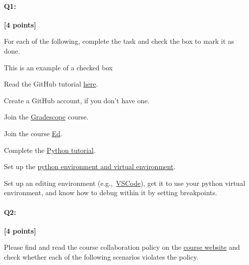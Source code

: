 \documentclass[11pt]{article}
\newcommand{\cmark}{\ding{51}}%
\newcommand{\done}{\rlap{$\square$}{\raisebox{2pt}{\large\hspace{1pt}\cmark}}%
\hspace{-2.5pt}}
\begin{document}
\pagebreak


\paragraph{Q1:} \textbf{[4 points]}
\begin{tcolorbox}[colback=orange!5!white,colframe=orange!75!black]
For each of the following, complete the task and check the box to mark it as done.
\end{tcolorbox}


\begin{tcolorbox}[colback=white!5!white,colframe=green!75!black]

\begin{todolist}
    \item[\done] This is an example of a checked box
    \item Read the GitHub tutorial \href{https://browncsci1430.github.io/webpage/resources/github_guide/}{here}.
    \item Create a GitHub account, if you don't have one.
    \item Join the \href{https://www.gradescope.com/}{Gradescope} course.
    \item Join the course \href{https://edstem.org/us/courses/35988/discussion/}{Ed}.
    \item Complete the \href{https://browncsci1430.github.io/webpage/resources/python_tutorial/}{Python tutorial}.
    \item Set up the \href{https://browncsci1430.github.io/webpage/resources/python_setup/}{python environment and virtual environment}.
    \item Set up an editing environment (e.g.,~\href{https://browncsci1430.github.io/webpage/resources/vscode_setup/}{VSCode}), get it to use your python virtual environment, and know how to debug within it by setting breakpoints.
\end{todolist}
\end{tcolorbox}

\pagebreak

\paragraph{Q2:} 
\textbf{[4 points]}
\begin{tcolorbox}[colback=orange!5!white,colframe=orange!75!black]
Please find and read the course collaboration policy on the \href{https://browncsci1430.github.io/webpage/}{course website} and check whether each of the following scenarios violates the policy.
\end{tcolorbox}
\end{document}
